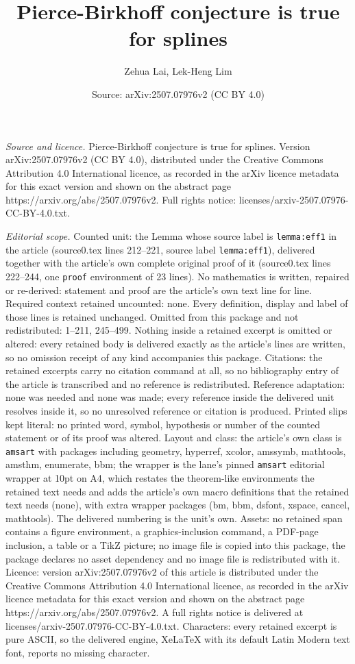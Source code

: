 \documentclass[10pt,a4paper]{amsart}
\title[Pierce-Birkhoff conjecture is true for splines]{Pierce-Birkhoff conjecture is true for splines}
\author{Zehua Lai, Lek-Heng Lim}
\date{Source: arXiv:2507.07976v2 (CC BY 4.0)}
\begin{document}
\maketitle

\noindent\emph{Source and licence.} Pierce-Birkhoff conjecture is true for splines. Version arXiv:2507.07976v2 (CC BY 4.0), distributed under the Creative Commons Attribution 4.0 International licence, as recorded in the arXiv licence metadata for this exact version and shown on the abstract page https://arxiv.org/abs/2507.07976v2. Full rights notice: licenses/arxiv-2507.07976-CC-BY-4.0.txt.\par\smallskip

\noindent\textit{Editorial scope.} Counted unit: the Lemma whose source label is \texttt{lemma:eff1} in the article (source0.tex lines 212--221, source label \texttt{lemma:eff1}), delivered together with the article's own complete original proof of it (source0.tex lines 222--244, one \texttt{proof} environment of 23 lines). No mathematics is written, repaired or re-derived: statement and proof are the article's own text line for line. Required context retained uncounted: none. Every definition, display and label of those lines is retained unchanged. Omitted from this package and not redistributed: 1--211, 245--499. Nothing inside a retained excerpt is omitted or altered: every retained body is delivered exactly as the article's lines are written, so no omission receipt of any kind accompanies this package. Citations: the retained excerpts carry no citation command at all, so no bibliography entry of the article is transcribed and no reference is redistributed. Reference adaptation: none was needed and none was made; every reference inside the delivered unit resolves inside it, so no unresolved reference or citation is produced. Printed slips kept literal: no printed word, symbol, hypothesis or number of the counted statement or of its proof was altered. Layout and class: the article's own class is \texttt{amsart} with packages including geometry, hyperref, xcolor, amssymb, mathtools, amsthm, enumerate, bbm; the wrapper is the lane's pinned \texttt{amsart} editorial wrapper at 10pt on A4, which restates the theorem-like environments the retained text needs and adds the article's own macro definitions that the retained text needs (none), with extra wrapper packages (bm, bbm, dsfont, xspace, cancel, mathtools). The delivered numbering is the unit's own. Assets: no retained span contains a figure environment, a graphics-inclusion command, a PDF-page inclusion, a table or a TikZ picture; no image file is copied into this package, the package declares no asset dependency and no image file is redistributed with it. Licence: version arXiv:2507.07976v2 of this article is distributed under the Creative Commons Attribution 4.0 International licence, as recorded in the arXiv licence metadata for this exact version and shown on the abstract page https://arxiv.org/abs/2507.07976v2. A full rights notice is delivered at licenses/arxiv-2507.07976-CC-BY-4.0.txt. Characters: every retained excerpt is pure ASCII, so the delivered engine, XeLaTeX with its default Latin Modern text font, reports no missing character.
\end{document}
